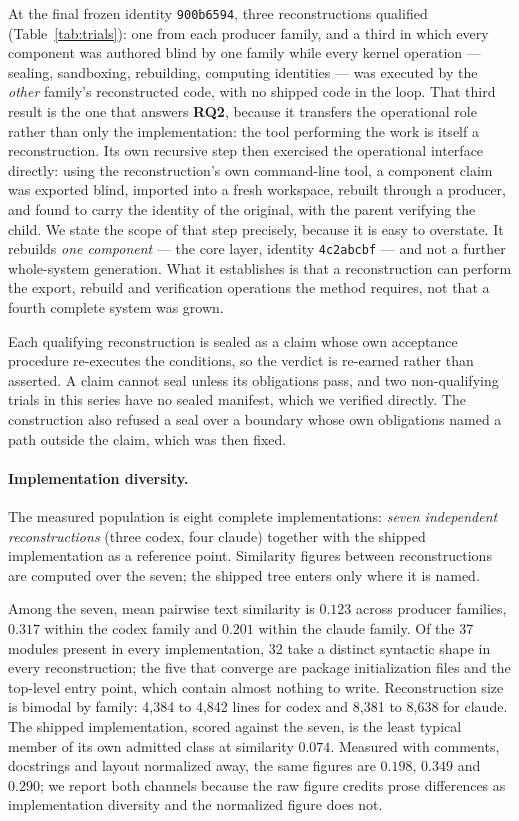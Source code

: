 \documentclass[10pt,twocolumn]{article}
\newcommand{\RQ}[1]{\textbf{RQ#1}}
\begin{document}
At the final frozen identity \texttt{900b6594}, three reconstructions
qualified (Table~\ref{tab:trials}): one from each producer family, and a
third in which every component was authored blind by one family while
every kernel operation --- sealing, sandboxing, rebuilding, computing
identities --- was executed by the \emph{other} family's reconstructed
code, with no shipped code in the loop. That third result is the one
that answers \RQ{2}, because it transfers the operational role rather
than only the implementation: the tool performing the work is itself a
reconstruction. Its own recursive step then exercised the operational
interface directly: using the reconstruction's own command-line tool, a
component claim was exported blind, imported into a fresh workspace,
rebuilt through a producer, and found to carry the identity of the
original, with the parent verifying the child. We state the scope of
that step precisely, because it is easy to overstate. It rebuilds
\emph{one component} --- the core layer, identity \texttt{4c2abcbf} ---
and not a further whole-system generation. What it establishes is that a
reconstruction can perform the export, rebuild and verification
operations the method requires, not that a fourth complete system was
grown.

Each qualifying reconstruction is sealed as a claim whose own acceptance
procedure re-executes the conditions, so the verdict is re-earned rather
than asserted. A claim cannot seal unless its obligations pass, and two
non-qualifying trials in this series have no sealed manifest, which we
verified directly. The construction also refused a seal over a boundary
whose own obligations named a path outside the claim, which was then
fixed.

\paragraph{Implementation diversity.} The measured population is eight
complete implementations: \emph{seven independent reconstructions}
(three codex, four claude) together with the shipped implementation as a
reference point. Similarity figures between reconstructions are computed
over the seven; the shipped tree enters only where it is named.

Among the seven, mean pairwise text similarity is $0.123$ across producer
families, $0.317$ within the codex family and $0.201$ within the claude
family. Of the 37 modules present in every implementation, 32 take a
distinct syntactic shape in every reconstruction; the five that converge
are package initialization files and the top-level entry point, which
contain almost nothing to write. Reconstruction size is bimodal by
family: 4{,}384 to 4{,}842 lines for codex and 8{,}381 to 8{,}638 for
claude. The shipped implementation, scored against the seven, is the
least typical member of its own admitted class at similarity $0.074$. Measured with comments, docstrings and
layout normalized away, the same figures are $0.198$, $0.349$ and $0.290$;
we report both channels because the raw figure credits prose differences
as implementation diversity and the normalized figure does not.
\end{document}
